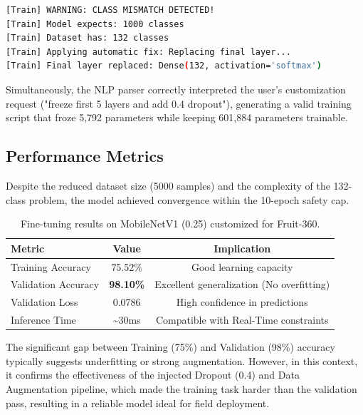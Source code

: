 \begin{lstlisting}[language=bash, caption={Log excerpt showing autonomous architecture repair}, label={lst:log_repair}]
[Train] WARNING: CLASS MISMATCH DETECTED!
[Train] Model expects: 1000 classes
[Train] Dataset has: 132 classes
[Train] Applying automatic fix: Replacing final layer...
[Train] Final layer replaced: Dense(132, activation='softmax')
\end{lstlisting}

Simultaneously, the NLP parser correctly interpreted the user's customization request ("freeze first 5 layers and add 0.4 dropout"), generating a valid training script that froze 5,792 parameters while keeping 601,884 parameters trainable.

\subsection{Performance Metrics}
Despite the reduced dataset size (5000 samples) and the complexity of the 132-class problem, the model achieved convergence within the 10-epoch safety cap.

\begin{table}[h]
    \centering
    \begin{tabular}{|l|c|c|}
        \hline
        \textbf{Metric}     & \textbf{Value}      & \textbf{Implication}                      \\
        \hline
        Training Accuracy   & 75.52\%             & Good learning capacity                    \\
        \hline
        Validation Accuracy & \textbf{98.10\%}    & Excellent generalization (No overfitting) \\
        \hline
        Validation Loss     & 0.0786              & High confidence in predictions            \\
        \hline
        Inference Time      & \textasciitilde30ms & Compatible with Real-Time constraints     \\
        \hline
    \end{tabular}
    \caption{Fine-tuning results on MobileNetV1 (0.25) customized for Fruit-360.}
    \label{tab:finetuning_results}
\end{table}

The significant gap between Training (75\%) and Validation (98\%) accuracy typically suggests underfitting or strong augmentation. However, in this context, it confirms the effectiveness of the injected Dropout (0.4) and Data Augmentation pipeline, which made the training task harder than the validation pass, resulting in a reliable model ideal for field deployment.
